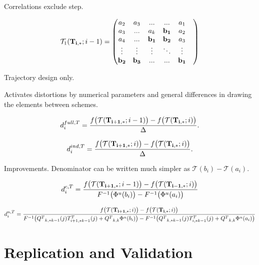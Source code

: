\documentclass[a4paper,12pt]{article}
\begin{document}
Correlations exclude step.

\begin{align}
\mathcal{T}_1(\bold{T_{i,*}}; i-1)=
\begin{pmatrix}
a_2 & a_3 & ... & ... &  a_1 \\
a_3 & ... & a_k &  \bold{b_1} & a_2 \\
a_4 & ... & \bold{b_1} &  \bold{b_2} & a_3 & \\
\vdots & \vdots & \vdots & 	\ddots &  \vdots\\
\bold{b_2} & \bold{b_{3}} & ... & ... &  \bold{b_{1}}
\end{pmatrix}
\end{align}

\newpage
Trajectory design only.

Activates distortions by numerical parameters and general differences in drawing the elements between schemes.

\begin{align} \label{eq:d_full}
d_i^{full,T} = \frac{f\big(\mathcal{T}(\bold{T_{i+1,*}}; i-1)\big) - f\big(\mathcal{T}(\bold{T_{i,*}}; i)\big)}{\Delta}.
\end{align}


\begin{align} \label{eq:d_ind}
d_i^{ind, T} = \frac{f\big(\mathcal{T}(\bold{T_{i+1,*}}; i)\big) - f\big(\mathcal{T}(\bold{T_{i,*}}; i)\big)}{\Delta}.
\end{align}

\newpage
Improvements. Denominator can be written much simpler as $\mathcal{T}(b_i) - \mathcal{T}(a_i)$.

\begin{align}
d_i^{c,T} = \frac{f\big(\mathcal{T}(\bold{T_{i+1,*}}; i-1)\big) - f\big(\mathcal{T}(\bold{T_{i-1,*}}; i)\big)}{F^{-1}\big(\Phi^u(b_i)\big) - F^{-1}\big( \Phi^u(a_i)\big)}
\end{align}

\begin{align} \label{eq:u1}
d_i^{u, T} = \frac{f\big(\mathcal{T}(\bold{T_{i+1,*}}; i)\big) - f\big(\mathcal{T}(\bold{T_{i,*}}; i)\big)}{F^{-1}\big({Q^T}_{k,*k-1}(j)T_{i+1,*k-1}^T(j) + {Q^T}_{k,k} \Phi^u(b_i)\big) - F^{-1}\big({Q^T}_{k,*k-1}(j)T_{i,*k-1}^T(j)+{Q^T}_{k,k} \Phi^u(a_i)\big)}
\end{align}
\newpage

\section{Replication and Validation}
\end{document}
